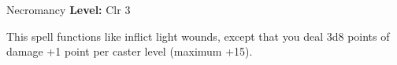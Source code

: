 {Necromancy}
{
	\textbf{Level:}
	Clr 3\\
}
{
	This spell functions like inflict light wounds, except that you deal 3d8 points of damage +1 point per caster level (maximum +15).

}
